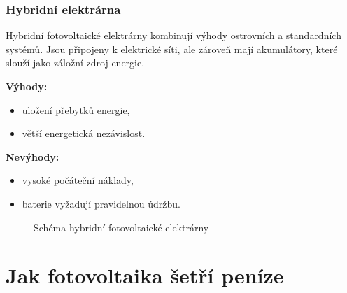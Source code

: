 \subsubsection{Hybridní elektrárna}

Hybridní fotovoltaické elektrárny kombinují výhody ostrovních a standardních systémů.
Jsou připojeny k elektrické síti, ale zároveň mají akumulátory, které slouží jako záložní zdroj energie.

\begin{multicols}{2}
    \textbf{Výhody:}
    \begin{itemize}[leftmargin=*]
        \item uložení přebytků energie,
        \item větší energetická nezávislost.
    \end{itemize}
    
    \columnbreak
    
    \textbf{Nevýhody:}
    \begin{itemize}[leftmargin=*]
        \item vysoké počáteční náklady,
        \item baterie vyžadují pravidelnou údržbu.
    \end{itemize}

\end{multicols}

\begin{figure}[h]
    \centering
    \caption{Schéma hybridní fotovoltaické elektrárny}
    \label{fig:hybrid_schema}
\end{figure}


\section{Jak fotovoltaika šetří peníze}
